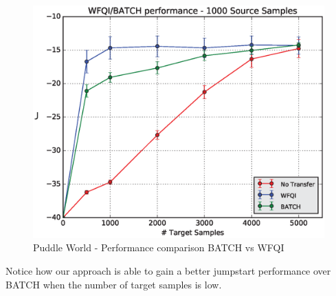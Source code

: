     \begin{figure}[H]
      \centering
      \includegraphics[scale=0.5]{images/WFQIPerfCMP.eps}
      \caption{Puddle World - Performance comparison BATCH vs WFQI}
      \label{}
    \end{figure}


    \noindent Notice how our approach is able to gain a better jumpstart performance over BATCH when the number of target samples is low.\newline

